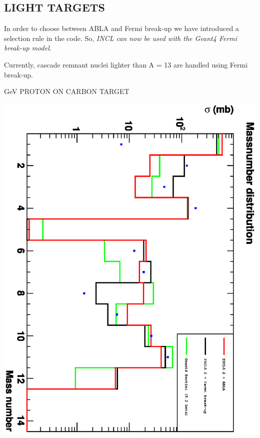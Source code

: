 \documentclass[20pt]{article}
\newenvironment{textbox}
{\begin{lrbox}{\dummybox}\begin{minipage}{0.9\columnwidth}}
{\end{minipage}\end{lrbox}\raisebox{-\depth}{\psshadowbox[framesep=1em,framearc=.1,shadow=true]{\usebox{\dummybox}}}\vspace{0.005\textheight}}
\begin{document}
\begin{center}
\begin{multicols}{3}
\begin{textbox}
\section*{{\Huge {\sf LIGHT TARGETS}}}

{\color{udsect}
In order to choose between ABLA and Fermi break-up we have
introduced a selection rule in the code. 
So, \emph{{\sf INCL} can now be used with the {\sf Geant4} Fermi break-up model}.
}

\vspace{1cm}
Currently, cascade remnant nuclei lighter than A = 13 are handled using Fermi break-up.

\end{textbox}

\begin{center}
{\Huge { GeV PROTON  ON CARBON TARGET}}

\vspace{1cm}
\includegraphics[scale=0.67,angle=90]{images/masses.eps}
\end{center}


\end{multicols}
\end{center}
\end{document}
